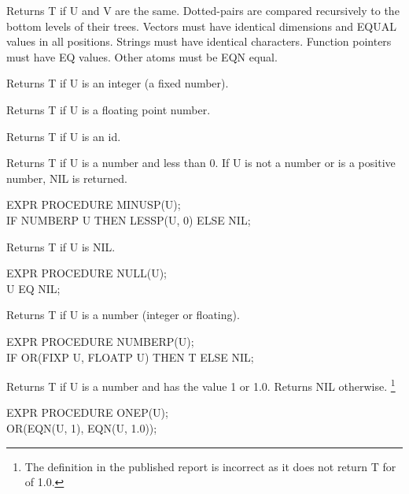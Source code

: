 \documentclass[11pt,letterpaper]{book}
\begin{document}
{Returns T if U and V are the same. Dotted-pairs are compared
recursively to the bottom levels of their trees. Vectors must have
identical dimensions and EQUAL values in all positions. Strings must
  have identical characters.
Function pointers must have EQ values. Other atoms must be EQN equal. }


{Returns T if U is an integer (a fixed number).}


{Returns T if U is a floating point number. }


{Returns T if U is an id.}


{Returns T if U is a number and less than 0.  If U is not a number or
is a positive number, NIL is returned.

{\tt \begin{tabbing} EXPR PROCEDURE MINUSP(U); \\
\hspace*{1em} IF NUMBERP U THEN LESSP(U, 0) ELSE NIL;
\end{tabbing}}}


{Returns T if U is NIL.

{\tt \begin{tabbing} EXPR PROCEDURE NULL(U); \\
\hspace*{1em} U EQ NIL;
\end{tabbing}}}


{Returns T if U is a number (integer or floating).

{\tt \begin{tabbing} EXPR PROCEDURE NUMBERP(U); \\
\hspace*{1em} IF OR(FIXP U, FLOATP U) THEN T ELSE NIL;
\end{tabbing}}}


{Returns T if U is a number and has the value 1 or 1.0.  Returns NIL
otherwise. \footnote{The definition in the published report is
incorrect as it does not return T for  of 1.0.}

{\tt \begin{tabbing} EXPR PROCEDURE ONEP(U); \\
\hspace*{1em} OR(EQN(U, 1), EQN(U, 1.0));
\end{tabbing}}}
\end{document}
